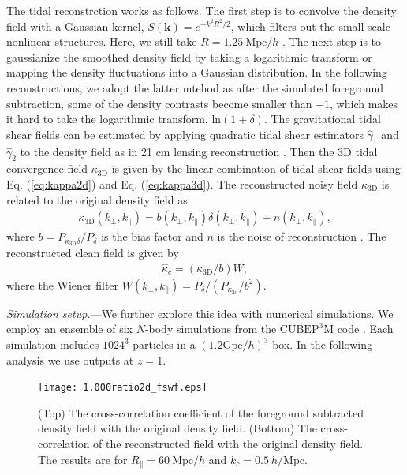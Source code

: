 \documentclass[aps,prl,twocolumn,showpacs,superscriptaddress,groupedaddress,nofootinbib,floatfix]{revtex4}  %
\newcommand{\mr}{\mathrm}
\begin{document}
The tidal reconstrction works as follows. The first step is to convolve
the density field with a Gaussian kernel, $S(\bm{k})=e^{-k^2R^2/2}$, which
filters out the small-scale nonlinear structures.
Here, we still take $R=1.25\ \mr{Mpc}/h$ \cite{2012:pen,2015:zhu}. The
next step is to gaussianize the smoothed density field by taking a logarithmic
transform or mapping the density fluctuations into a Gaussian distribution. In 
the following reconstructions, we adopt the latter mtehod as after the simulated
foreground subtraction, some of the density contrasts become smaller than $-1$,
which makes it hard to take the logarithmic transform, $\mathrm{ln}(1+\delta)$.
The gravitational tidal shear fields can be estimated by applying quadratic 
tidal shear estimators $\hat{\gamma}_1$ and $\hat{\gamma}_2$ to the density 
field as in 21 cm lensing reconstruction \cite{2008:lu}. 
Then the 3D tidal convergence field $\kappa_\mr{3D}$ is given by the linear 
combination of tidal shear fields using Eq. (\ref{eq:kappa2d}) and 
Eq. (\ref{eq:kappa3d}).
The reconstructed noisy field $\kappa_\mr{3D}$ is related to the original 
density field as 
\begin{eqnarray}
\kappa_\mr{3D}(k_\perp,k_\parallel)=b(k_\perp,k_\parallel)
\delta(k_\perp,k_\parallel)+n(k_\perp,k_\parallel),
\end{eqnarray}
where $b=P_{\kappa_\mr{3D}\delta}/P_{\delta}$ is the bias factor and $n$ is 
the noise of reconstruction \cite{2015:zhu}. 
The reconstructed clean field is given by 
\begin{eqnarray}
\label{eq:kapc}
\hat{\kappa}_c=({\kappa_\mr{3D}}/{b})W,
\end{eqnarray}
where the Wiener filter $W(k_\perp,k_\parallel)=
P_\delta/(P_{\kappa_\mr{3d}}/b^2)$.

{\it Simulation setup.}---We further explore this idea with numerical 
simulations. We employ an ensemble of six $N$-body simulations from the
$\mr{CUBEP}^3\mr{M}$ code \cite{2013:code}. 
Each simulation includes $1024^3$ particles in a $(1.2\mr{Gpc}/h)^3$ box. 
In the following analysis we use outputs at $z=1$.

\begin{figure}[tbp]
\begin{center}
\texttt{[image: 1.000ratio2d\_fswf.eps]}
\end{center}
\vspace{-0.7cm}
\caption{(Top) The cross-correlation coefficient of the  
foreground subtracted density field with the original density field.
(Bottom) The cross-correlation of the reconstructed field with the original 
density field. 
The results are for $R_\parallel=60\ \mr{Mpc}/h$ and $k_c=0.5\ h/\mr{Mpc}$.}
\label{fig:ratio}
\end{figure}
\end{document}
